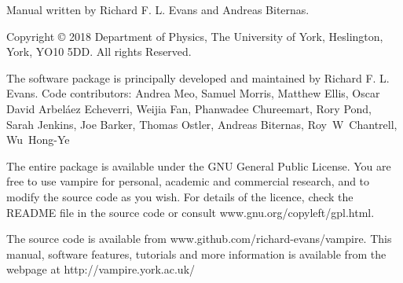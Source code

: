 \noindent Manual written by Richard F. L. Evans and Andreas Biternas.\\
\par
\noindent Copyright \copyright \xspace 2018 Department of Physics, The University of York, Heslington, York, YO10 5DD. All rights Reserved.\\
\par
\noindent The \vampire software package is principally developed and maintained by Richard F. L. Evans. Code contributors: Andrea Meo, Samuel Morris, Matthew Ellis, Oscar David Arbel\'aez Echeverri, Weijia Fan, Phanwadee Chureemart, Rory Pond, Sarah Jenkins, Joe Barker, Thomas Ostler, Andreas Biternas, Roy~W~Chantrell, Wu~Hong-Ye\\
\par
\noindent The entire \vampire package is available under the GNU General Public License. You are free to use vampire for personal, academic and commercial research, and to modify the source code as you wish. For details of the licence, check the README file in the source code or consult www.gnu.org/copyleft/gpl.html.\\
\par
\noindent The \vampire source code is available from www.github.com/richard-evans/vampire. This manual, software features, tutorials and more information is available from the \vampire webpage at http://vampire.york.ac.uk/\\
